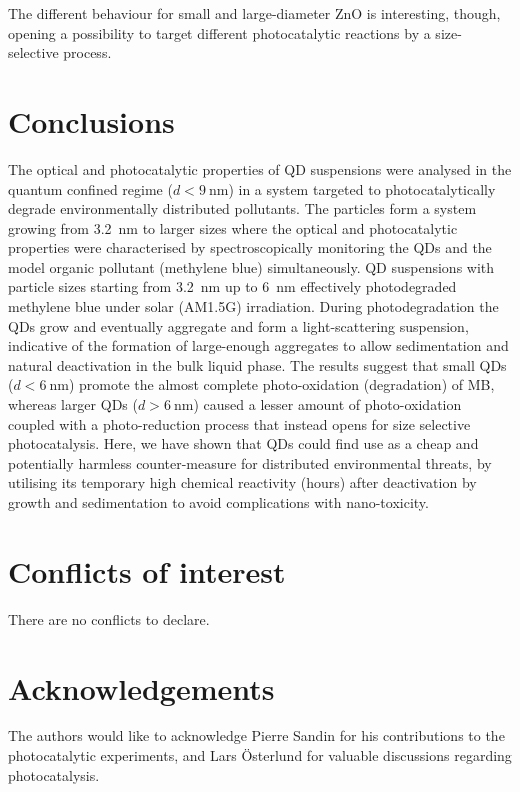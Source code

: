 \documentclass[9pt,twoside,twocolumn]{article}\usepackage{knitr}
\begin{document}
\begin{refsection}
The different behaviour for small and large-diameter ZnO is interesting, though, opening a possibility to target different photocatalytic reactions by a size-selective process. 




\section{Conclusions}

The optical and photocatalytic properties of  QD suspensions were analysed in the quantum confined regime ($d<\qty{9}{\nm}$) in a system targeted to photocatalytically degrade environmentally distributed pollutants.
The particles form a system growing from \qty{3.2}{\nm} to larger sizes where the optical and photocatalytic properties were characterised by spectroscopically monitoring the  QDs and the model organic pollutant (methylene blue) simultaneously.  QD suspensions with particle sizes starting from \qty{3.2}{\nm} up to \qty{6}{\nm} effectively photodegraded methylene blue under solar (AM1.5G) irradiation. During photodegradation the  QDs grow and eventually aggregate and form a light-scattering suspension, indicative of the formation of large-enough aggregates to allow sedimentation and natural deactivation in the bulk liquid phase. The results suggest that small QDs ($d<\qty{6}{\nm}$) promote the almost complete photo-oxidation (degradation) of MB, whereas larger QDs ($d>\qty{6}{\nm}$) caused a lesser amount of photo-oxidation coupled with a photo-reduction process that instead opens for size selective photocatalysis. Here, we have shown that  QDs could find use as a cheap and potentially harmless counter-measure for distributed environmental threats, by utilising its temporary high chemical reactivity (hours) after deactivation by growth and sedimentation to avoid complications with nano-toxicity.



\section*{Conflicts of interest}
There are no conflicts to declare.



\section*{Acknowledgements}
The authors would like to acknowledge Pierre Sandin for his contributions to the photocatalytic experiments, and Lars Österlund for valuable discussions regarding photocatalysis.

\printbibliography

\end{refsection}
\end{document}
